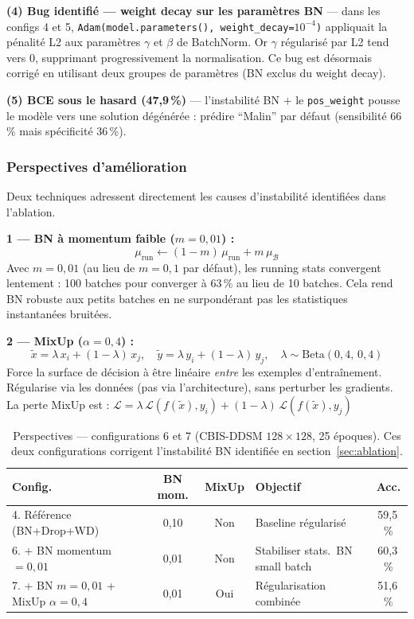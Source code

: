 \documentclass[a4paper,11pt]{article}
\begin{document}
\textbf{(4) Bug identifié — weight decay sur les paramètres BN} — dans les configs 4 et 5,
\texttt{Adam(model.parameters(), weight\_decay=$10^{-4}$)} appliquait la pénalité L2
aux paramètres $\gamma$ et $\beta$ de BatchNorm. Or $\gamma$ régularisé par L2 tend vers 0,
supprimant progressivement la normalisation. Ce bug est désormais corrigé en utilisant
deux groupes de paramètres (BN exclus du weight decay).

\textbf{(5) BCE sous le hasard (47{,}9\,\%)} — l'instabilité BN + le \texttt{pos\_weight}
pousse le modèle vers une solution dégénérée : prédire ``Malin'' par défaut
(sensibilité 66\,\% mais spécificité 36\,\%).

\subsubsection*{Perspectives d'amélioration}

Deux techniques adressent directement les causes d'instabilité identifiées dans l'ablation.

\textbf{1 — BN à momentum faible ($m = 0{,}01$) :}
\[
  \mu_{\text{run}} \leftarrow (1-m)\,\mu_{\text{run}} + m\,\mu_\mathcal{B}
\]
Avec $m = 0{,}01$ (au lieu de $m = 0{,}1$ par défaut), les running stats convergent
lentement : 100 batches pour converger à 63\,\% au lieu de 10 batches.
Cela rend BN robuste aux petits batches en ne surpondérant pas les statistiques
instantanées bruitées.

\textbf{2 — MixUp ($\alpha = 0{,}4$) :}
\[
  \tilde{x} = \lambda\,x_i + (1-\lambda)\,x_j, \quad
  \tilde{y} = \lambda\,y_i + (1-\lambda)\,y_j, \quad
  \lambda \sim \mathrm{Beta}(0{,}4,\,0{,}4)
\]
Force la surface de décision à être linéaire \emph{entre} les exemples d'entraînement.
Régularise via les données (pas via l'architecture), sans perturber les gradients.
La perte MixUp est :
$\mathcal{L} = \lambda\,\mathcal{L}(f(\tilde{x}), y_i) + (1-\lambda)\,\mathcal{L}(f(\tilde{x}), y_j)$

\begin{table}[H]
\centering
\caption{Perspectives — configurations 6 et 7 (CBIS-DDSM $128\times128$, 25 époques).
         Ces deux configurations corrigent l'instabilité BN identifiée en section~\ref{sec:ablation}.}
\small
\begin{tabular}{lccp{4.5cm}c}
\toprule
\textbf{Config.} & \textbf{BN mom.} & \textbf{MixUp} & \textbf{Objectif} & \textbf{Acc.} \\
\midrule
4. Référence (BN+Drop+WD)              & 0{,}10 & Non & Baseline régularisé & 59{,}5\,\% \\
6. + BN momentum $= 0{,}01$            & 0{,}01 & Non & Stabiliser stats.\ BN small batch & 60{,}3\,\% \\
7. + BN $m{=}0{,}01$ + MixUp $\alpha{=}0{,}4$ & 0{,}01 & Oui & Régularisation combinée & 51{,}6\,\% \\
\bottomrule
\end{tabular}
\label{tab:perspectives}
\end{table}
\end{document}
